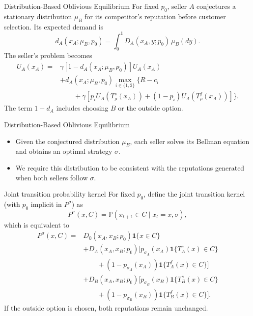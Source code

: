 \documentclass[10pt]{beamer}
\begin{document}
\begin{frame}{Distribution-Based Oblivious Equilibrium}
    For fixed $p_0$, seller $A$ conjectures a stationary distribution
    $\mu_B$ for its competitor's reputation before customer selection.
    Its expected demand is
    \begin{equation}
        d_A(x_A;\mu_B,p_0) =\int_0^1 D_A(x_A,y;p_0)\,\mu_B(dy).
    \end{equation}
    The seller's problem becomes 
    \begin{equation}
        \begin{aligned}
            U_A(x_A) ={}& \gamma[1-d_A(x_A;\mu_B,p_0)]U_A(x_A)\\ &+ d_A(x_A;\mu_B,p_0)
            \max_{i\in\{1,2\}}\Big\{ R-c_i\\
            &\qquad+\gamma\left[ p_i U_A(T_\rho^s(x_A)) + (1-p_i)U_A(T_\rho^f(x_A))
            \right] \Big\}.
        \end{aligned}
    \end{equation}
    The term $1-d_A$ includes choosing $B$ or the outside option.
\end{frame}

\begin{frame}{Distribution-Based Oblivious Equilibrium}
    \begin{itemize}
        \item Given the conjectured distribution $\mu_B$, each seller solves its Bellman equation and obtains an optimal strategy $\sigma$.
        \item We require this distribution to be consistent with the reputations generated when both sellers follow $\sigma$.
    \end{itemize}
\end{frame}

\begin{frame}{Joint transition probability kernel}
    For fixed $p_0$, define the joint transition kernel
    (with $p_0$ implicit in $P^\sigma$) as
    \[
        P^\sigma(x,C)=\mathbb{P}(x_{t+1}\in C\mid x_t=x,\sigma),
    \]
    which is equivalent to
    \begin{equation}
        \begin{aligned}
            P^\sigma(x,C)
            ={}&D_0(x_A,x_B;p_0)\mathbf{1}\{x\in C\}\\
            &+D_A(x_A,x_B;p_0)\Big[
                p_{\sigma_A}(x_A)\mathbf{1}\{T_A^s(x)\in C\}\\
            &\qquad +(1-p_{\sigma_A}(x_A))\mathbf{1}\{T_A^f(x)\in C\}\Big]\\
            &+D_B(x_A,x_B;p_0)\Big[
                p_{\sigma_B}(x_B)\mathbf{1}\{T_B^s(x)\in C\}\\
            &\qquad +(1-p_{\sigma_B}(x_B))\mathbf{1}\{T_B^f(x)\in C\}\Big].
        \end{aligned}
    \end{equation}
    If the outside option is chosen, both reputations remain unchanged.
\end{frame}
\end{document}

